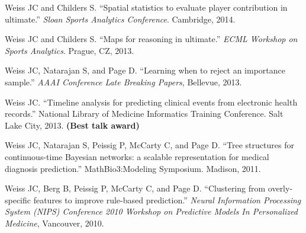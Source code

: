 \begin{bibsection}
\item  Weiss JC and Childers S. ``Spatial statistics to evaluate player contribution in ultimate.'' \textit{Sloan Sports Analytics Conference}. Cambridge, 2014.

\item  Weiss JC and Childers S. ``Maps for reasoning in ultimate.'' \textit{ECML Workshop on Sports Analytics}. Prague, CZ, 2013.

\item  Weiss JC, Natarajan S, and Page D. ``Learning when to reject an importance sample.'' \textit{AAAI Conference Late Breaking Papers}, Bellevue, 2013.

\item  Weiss JC. ``Timeline analysis for predicting clinical events from electronic health records.'' National Library of Medicine Informatics Training Conference. Salt Lake City, 2013. \textbf{(Best talk award)}

\item  Weiss JC, Natarajan S, Peissig P, McCarty C, and Page D. ``Tree structures for continuous-time Bayesian networks: a scalable representation for medical diagnosis prediction.'' MathBio3:Modeling Symposium. Madison, 2011.

\item  Weiss JC, Berg B, Peissig P, McCarty C, and Page D. ``Clustering from overly-specific features to improve rule-based prediction.'' \textit{Neural Information Processing System (NIPS) Conference 2010 Workshop on Predictive Models In Personalized Medicine}, Vancouver, 2010.
 
\end{bibsection}


